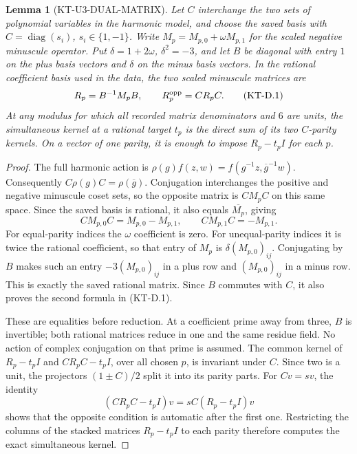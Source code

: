 \documentclass[11pt,a4paper]{article}
\newtheorem{lemma}[theorem]{Lemma}
\theoremstyle{definition}
\begin{document}
\begin{lemma}[KT-U3-DUAL-MATRIX]
Let $C$ interchange the two sets of polynomial variables in the
harmonic model, and choose the saved basis with
$C=\operatorname{diag}(s_i)$, $s_i\in\{1,-1\}$.
Write $M_p=M_{p,0}+\omega M_{p,1}$ for the scaled negative
minuscule operator.  Put $\delta=1+2\omega$, $\delta^2=-3$,
and let $B$ be diagonal with entry $1$ on the plus basis
vectors and $\delta$ on the minus basis vectors.  In the
rational coefficient basis used in the data, the two scaled
minuscule matrices are
\[
       R_p=B^{-1}M_pB,\qquad R_p^{\rm opp}=CR_pC.
                                                               \tag{KT-D.1}
\]
At any modulus for which all recorded matrix denominators and
$6$ are units, the simultaneous kernel at a rational target $t_p$
is the direct sum of its two $C$-parity kernels.  On a vector of
one parity, it is enough to impose $R_p-t_pI$ for each $p$.
\end{lemma}
\begin{proof}
The full harmonic action is
$\rho(g)f(z,w)=f(g^{-1}z,\overline g^{-1}w)$.
Consequently $C\rho(g)C=\rho(\overline g)$.
Conjugation interchanges the positive and negative minuscule
coset sets, so the opposite matrix is $CM_pC$ on this same
space.  Since the saved basis is rational, it also equals
$\overline{M_p}$, giving
\[
 CM_{p,0}C=M_{p,0}-M_{p,1},\qquad
 CM_{p,1}C=-M_{p,1}.
\]
For equal-parity indices the $\omega$ coefficient is zero.
For unequal-parity indices it is twice the rational coefficient,
so that entry of $M_p$ is $\delta(M_{p,0})_{ij}$.
Conjugating by $B$ makes such an entry
$-3(M_{p,0})_{ij}$ in a plus row and
$(M_{p,0})_{ij}$ in a minus row.  This is exactly the saved
rational matrix.  Since $B$ commutes with $C$, it also proves
the second formula in (KT-D.1).

These are equalities before reduction.  At a coefficient
prime away from three, $B$ is invertible; both rational
matrices reduce in one and the same residue field.  No action
of complex conjugation on that prime is assumed.
The common kernel of $R_p-t_pI$ and $CR_pC-t_pI$, over all
chosen $p$, is invariant under $C$.  Since two is a unit,
the projectors $(1\pm C)/2$ split it into its parity parts.
For $Cv=sv$, the identity
\[
        (CR_pC-t_pI)v=sC(R_p-t_pI)v
\]
shows that the opposite condition is automatic after the
first one.  Restricting the columns of the stacked matrices
$R_p-t_pI$ to each parity therefore computes the exact
simultaneous kernel.
\end{proof}
\end{document}

